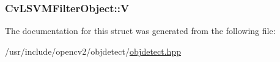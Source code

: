 \hypertarget{structCvLSVMFilterObject_aa863bb7dd44594c6c5e9958c2889a0d0}{
\subsubsection[{V}]{ Cv\-L\-S\-V\-M\-Filter\-Object\-::\-V}}\label{structCvLSVMFilterObject_aa863bb7dd44594c6c5e9958c2889a0d0}


The documentation for this struct was generated from the following file\-:\begin{DoxyCompactItemize}
\item 
/usr/include/opencv2/objdetect/\hyperlink{objdetect_8hpp}{objdetect.\-hpp}\end{DoxyCompactItemize}
